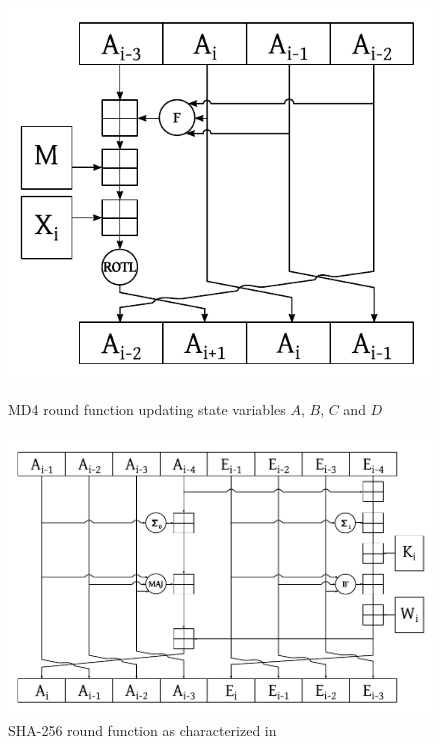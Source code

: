 \begin{figure}[p]
  \begin{center}
    \includegraphics{img/md4.pdf}
    \caption{MD4 round function updating state variables $A$, $B$, $C$ and $D$}
    \label{fig:md4-round-function}
  \end{center}
  \begin{center}
    \includegraphics[width=\textwidth]{img/sha256.pdf}
    \caption{SHA-256 round function as characterized in~\cite{analysisSHA256}}
    \label{fig:sha256-round-function}
  \end{center}
\end{figure}










